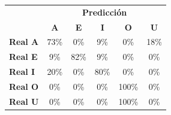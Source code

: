 \begin{tabular}{lccccc}
\toprule
 & \multicolumn{5}{c}{\textbf{Predicción}} \\
 & \textbf{A} & \textbf{E} & \textbf{I} & \textbf{O} & \textbf{U} \\
\midrule
\textbf{Real A} & \cellcolor[rgb]{0.49,0.49,1.00} \color{white} 73\% & \cellcolor[rgb]{1.00,1.00,1.00}  0\% & \cellcolor[rgb]{0.94,0.94,1.00}  9\% & \cellcolor[rgb]{1.00,1.00,1.00}  0\% & \cellcolor[rgb]{0.87,0.87,1.00}  18\% \\
\textbf{Real E} & \cellcolor[rgb]{0.94,0.94,1.00}  9\% & \cellcolor[rgb]{0.43,0.43,1.00} \color{white} 82\% & \cellcolor[rgb]{0.94,0.94,1.00}  9\% & \cellcolor[rgb]{1.00,1.00,1.00}  0\% & \cellcolor[rgb]{1.00,1.00,1.00}  0\% \\
\textbf{Real I} & \cellcolor[rgb]{0.86,0.86,1.00}  20\% & \cellcolor[rgb]{1.00,1.00,1.00}  0\% & \cellcolor[rgb]{0.44,0.44,1.00} \color{white} 80\% & \cellcolor[rgb]{1.00,1.00,1.00}  0\% & \cellcolor[rgb]{1.00,1.00,1.00}  0\% \\
\textbf{Real O} & \cellcolor[rgb]{1.00,1.00,1.00}  0\% & \cellcolor[rgb]{1.00,1.00,1.00}  0\% & \cellcolor[rgb]{1.00,1.00,1.00}  0\% & \cellcolor[rgb]{0.30,0.30,1.00} \color{white} 100\% & \cellcolor[rgb]{1.00,1.00,1.00}  0\% \\
\textbf{Real U} & \cellcolor[rgb]{1.00,1.00,1.00}  0\% & \cellcolor[rgb]{1.00,1.00,1.00}  0\% & \cellcolor[rgb]{1.00,1.00,1.00}  0\% & \cellcolor[rgb]{0.30,0.30,1.00} \color{white} 100\% & \cellcolor[rgb]{1.00,1.00,1.00}  0\% \\
\bottomrule
\end{tabular}